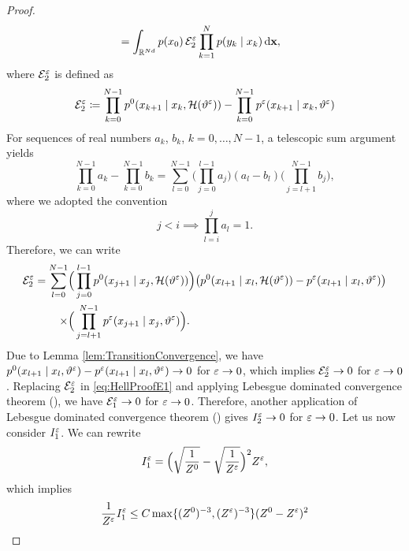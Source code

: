 \documentclass[10pt]{article}
\begin{document}
\begin{proof}
\begin{equation}
\begin{aligned}
		&= \int_{\mathbb{R}^{Nd}} p(x_0) \, \mathcal E_2^\varepsilon \prod_{k=1}^{N} p(y_k \mid x_k) \,\mathrm{d} \mathbf x,
	\end{aligned}
	\end{equation}
	where $\mathcal E_2^\varepsilon$ is defined as
	\begin{equation}
		\mathcal E_2^\varepsilon \coloneqq \prod_{k=0}^{N-1} p^0(x_{k+1}\mid x_k, \mathcal H(\vartheta^\varepsilon)) - \prod_{k=0}^{N-1} p^\varepsilon(x_{k+1}\mid x_k, \vartheta^\varepsilon)
	\end{equation}
	For sequences of real numbers $a_k$, $b_k$, $k = 0, \ldots, N-1$, a telescopic sum argument yields 
	\begin{equation} 
		\prod_{k=0}^{N-1} a_k - \prod_{k=0}^{N-1} b_k = \sum_{l=0}^{N-1} \Big(\prod_{j=0}^{l-1} a_j\Big)(a_l - b_l) \Big(\prod_{j=l+1}^{N-1} b_j\Big),
	\end{equation}
	where we adopted the convention
	\begin{equation}
		j < i \implies \prod_{l=i}^j a_l = 1.
	\end{equation}
	Therefore, we can write
	\begin{equation}
	\begin{aligned}
		\mathcal E_2^\varepsilon = \sum_{l=0}^{N-1} &\Big(\prod_{j=0}^{l-1} p^0(x_{j+1}\mid x_j, \mathcal H(\vartheta^\varepsilon)) \Big) \big(p^0(x_{l+1}\mid x_l, \mathcal H(\vartheta^\varepsilon)) - p^\varepsilon(x_{l+1}\mid x_l, \vartheta^\varepsilon)\big)\\
		\times &\Big(\prod_{j=l+1}^{N-1} p^\varepsilon(x_{j+1}\mid x_j, \vartheta^\varepsilon)\Big).
	\end{aligned}
	\end{equation}
	Due to Lemma \ref{lem:TransitionConvergence}, we have $p^0(x_{l+1}\mid x_l, \vartheta^\varepsilon) - p^\varepsilon(x_{l+1}\mid x_l, \vartheta^\varepsilon) \to 0$ for $ \varepsilon \to 0$, which implies $\mathcal E_2^\varepsilon \to 0$ for $\varepsilon \to 0$. Replacing $\mathcal E^\varepsilon_2$ in \eqref{eq:HellProofE1} and applying Lebesgue dominated convergence theorem (), we have $\mathcal E^\varepsilon_1 \to 0$ for $\varepsilon \to 0$. Therefore, another application of Lebesgue dominated convergence theorem () gives $I_2^\varepsilon \to 0$ for $\varepsilon \to 0$. Let us now consider $I_1^\varepsilon$. We can rewrite 
	\begin{equation}
		I_1^\varepsilon = \Big(\sqrt{\frac{1}{Z^0}} - \sqrt{\frac{1}{Z^\varepsilon}}\Big)^2 Z^\varepsilon,
	\end{equation}
	which implies
	\begin{equation}
	\begin{aligned}
		\frac{1}{Z^\epl}I_1^\epl &\leq C \max\{(Z^0)^{-3}, (Z^\epl)^{-3}\}(Z^0 - Z^\epl)^2\\

\end{aligned}
\end{equation}
\end{proof}
\end{document}

